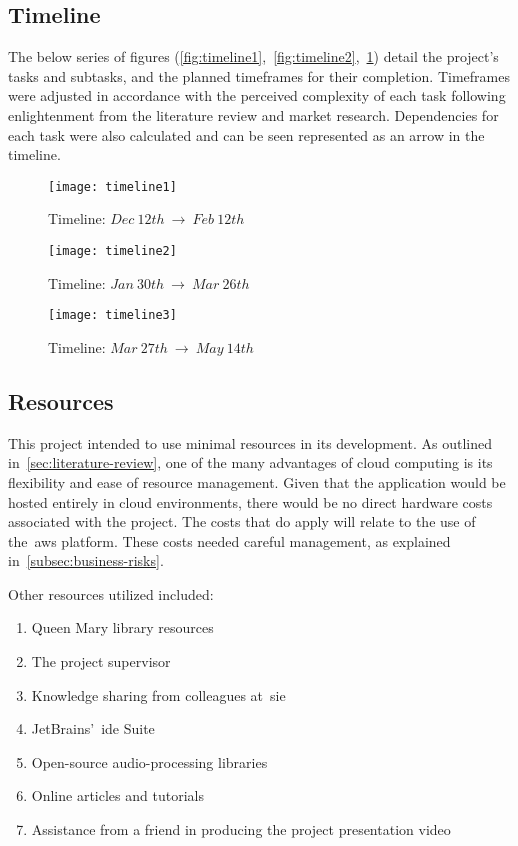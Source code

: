 \subsection{Timeline}\label{subsec:timeline}

The below series of figures (\ref{fig:timeline1},~\ref{fig:timeline2},~\ref{fig:timeline3}) detail the project's tasks and subtasks, and the planned timeframes for their completion.
Timeframes were adjusted in accordance with the perceived complexity of each task following enlightenment from the literature review and market research.
Dependencies for each task were also calculated and can be seen represented as an arrow in the timeline.

\begin{figure}[!htb]
    \minipage{\textwidth}
    \texttt{[image: timeline1]}
    \caption{Timeline: $Dec~12th~\rightarrow~Feb~12th$}\label{fig:timeline1}
    \endminipage\hfill
    \minipage{\textwidth}
    \texttt{[image: timeline2]}
    \caption{Timeline: $Jan~30th~\rightarrow~Mar~26th$}\label{fig:timeline2}
    \endminipage\hfill
    \minipage{\textwidth}
    \texttt{[image: timeline3]}
    \caption{Timeline: $Mar~27th~\rightarrow~May~14th$}\label{fig:timeline3}
    \endminipage
\end{figure}

\subsection{Resources}\label{subsec:resources}

This project intended to use minimal resources in its development.
As outlined in~\ref{sec:literature-review}, one of the many advantages of cloud computing is its flexibility and ease of resource management.
Given that the application would be hosted entirely in cloud environments, there would be no direct hardware costs associated with the project.
The costs that do apply will relate to the use of the~\gls{aws} platform.
These costs needed careful management, as explained in~\ref{subsec:business-risks}.

Other resources utilized included:

\begin{enumerate}
    \item Queen Mary library resources
    \item The project supervisor
    \item Knowledge sharing from colleagues at~\gls{sie}
    \item JetBrains’~\gls{ide} Suite
    \item Open-source audio-processing libraries
    \item Online articles and tutorials
    \item Assistance from a friend in producing the project presentation video
\end{enumerate}

